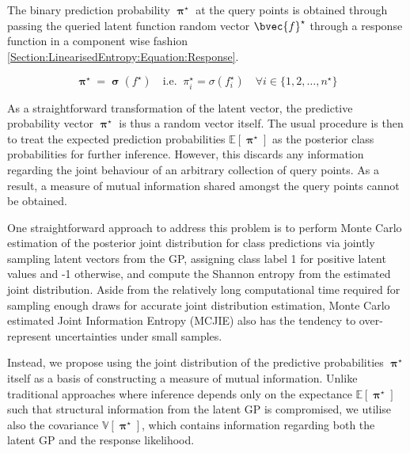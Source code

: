 \documentclass{article}
\renewcommand{\vec}[1]{\boldsymbol{#1}}
\begin{document}
		The binary prediction probability $\vec{\uppi^{\star}}$ at the query points is obtained through passing the queried latent function random vector $\bvec{f}^{\star}$ through a response function in a component wise fashion \eqref{Section:LinearisedEntropy:Equation:Response}.
		
		\begin{equation}
			\vec{\uppi}^{\star} = \vec{\upsigma}(f^{\star})\mathrm{ \quad i.e. \;\;}\pi^{\star}_{i} = \sigma(f^{\star}_{i}) \quad \forall i \in \{1, 2, \dots, n^{\star}\}
		\label{Section:LinearisedEntropy:Equation:Response}
		\end{equation}
		
		As a straightforward transformation of the latent vector, the predictive probability vector $\vec{\uppi^{\star}}$ is thus a random vector itself. The usual procedure is then to treat the expected prediction probabilities $\mathbb{E}[\vec{\uppi^{\star}}]$ as the posterior class probabilities for further inference. However, this discards any information regarding the joint behaviour of an arbitrary collection of query points. As a result, a measure of mutual information shared amongst the query points cannot be obtained.
		
		One straightforward approach to address this problem is to perform Monte Carlo estimation of the posterior joint distribution for class predictions via jointly sampling latent vectors from the GP, assigning class label 1 for positive latent values and -1 otherwise, and compute the Shannon entropy \cite{ShannonEntropy} from the estimated joint distribution. Aside from the relatively long computational time required for sampling enough draws for accurate joint distribution estimation, Monte Carlo estimated Joint Information Entropy (MCJIE) also has the tendency to over-represent uncertainties under small samples.
				
		Instead, we propose using the joint distribution of the predictive probabilities $\vec{\uppi^{\star}}$ itself as a basis of constructing a measure of mutual information. Unlike traditional approaches where inference depends only on the expectance $\mathbb{E}[\vec{\uppi^{\star}}]$ such that structural information from the latent GP is compromised, we utilise also the covariance $\mathbb{V}[\vec{\uppi^{\star}}]$, which contains information regarding both the latent GP and the response likelihood.
	
\end{document}
